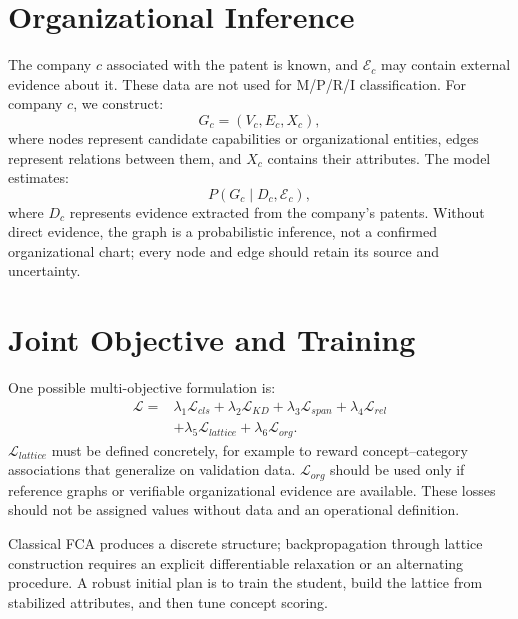 \documentclass[11pt,a4paper]{article}
\begin{document}
\section{Organizational Inference}
The company $c$ associated with the patent is known, and $\mathcal{E}_c$ may contain external evidence about it. These data are not used for M/P/R/I classification. For company $c$, we construct:
\begin{equation}
G_c=(V_c,E_c,X_c),
\end{equation}
where nodes represent candidate capabilities or organizational entities, edges represent relations between them, and $X_c$ contains their attributes. The model estimates:
\begin{equation}
P(G_c\mid D_c,\mathcal{E}_c),
\end{equation}
where $D_c$ represents evidence extracted from the company's patents. Without direct evidence, the graph is a probabilistic inference, not a confirmed organizational chart; every node and edge should retain its source and uncertainty.

\section{Joint Objective and Training}
One possible multi-objective formulation is:
\begin{align}
\mathcal{L}={}&
\lambda_1\mathcal{L}_{cls}
+\lambda_2\mathcal{L}_{KD}
+\lambda_3\mathcal{L}_{span}
+\lambda_4\mathcal{L}_{rel}\\
&+\lambda_5\mathcal{L}_{lattice}
+\lambda_6\mathcal{L}_{org}.
\end{align}
$\mathcal{L}_{lattice}$ must be defined concretely, for example to reward concept--category associations that generalize on validation data. $\mathcal{L}_{org}$ should be used only if reference graphs or verifiable organizational evidence are available. These losses should not be assigned values without data and an operational definition.

Classical FCA produces a discrete structure; backpropagation through lattice construction requires an explicit differentiable relaxation or an alternating procedure. A robust initial plan is to train the student, build the lattice from stabilized attributes, and then tune concept scoring.
\end{document}
